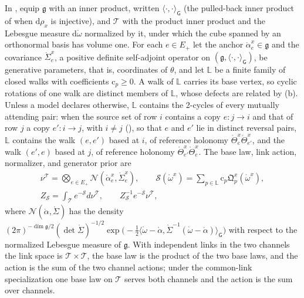 In , equip $\mathfrak g$ with an inner product,
written $\langle\cdot,\cdot\rangle_{\mathsf G}$ (the pulled-back inner product of
 when $\mathrm d\rho_x$ is injective), and $\mathscr T$ with the product inner
product and the Lebesgue measure $\mathrm d\mathring\omega$ normalized by it, under which the cube
spanned by an orthonormal basis has volume one. For each $e\in E_+$ let the anchor
$\mathring\alpha^x_e\in\mathfrak g$ and the covariance $\mathring\Sigma^x_e$, a positive definite
self-adjoint operator on $(\mathfrak g,\langle\cdot,\cdot\rangle_{\mathsf G})$, be generative parameters,
that is, coordinates of $\theta$, and let $\mathbb L$ be a finite family of closed walks with coefficients
$\mathrm c_p\geq0$. A walk of $\mathbb L$ carries its base vertex, so cyclic rotations of one walk are
distinct members of $\mathbb L$, whose defects are related by (b).
Unless a model declares otherwise, $\mathbb L$ contains the 2-cycles of every mutually attending pair:
when the source set of row $i$ contains a copy $e:j\to i$ and that of row $j$ a copy $e':i\to j$, with
$i\neq j$ (), so that $e$ and $e'$ lie in distinct reversal pairs,
$\mathbb L$ contains the walk $(e,e')$ based at $i$, of reference holonomy
$\mathring\Theta^x_e\mathring\Theta^x_{e'}$, and the walk $(e',e)$ based at $j$, of reference holonomy
$\mathring\Theta^x_{e'}\mathring\Theta^x_e$. The base law, link action, normalizer, and generator prior are
\begin{gather}
\nu^{\mathscr T}=\bigotimes_{e\in E_+}\mathcal N(\mathring\alpha^x_e,\mathring\Sigma^x_e),
\qquad
\mathscr S(\mathring\omega^x)=\sum_{p\in\mathbb L}\mathrm c_p\mathfrak Q^x_p(\mathring\omega^x),
\label{eq:link-base-action}\\
Z_{\mathscr S}=\int_{\mathscr T}e^{-\mathscr S}d\nu^{\mathscr T},
\qquad
Z_{\mathscr S}^{-1}e^{-\mathscr S}\nu^{\mathscr T},
\label{eq:link-generator-prior}
\end{gather}
where $\mathcal N(\mathring\alpha,\mathring\Sigma)$ has the density
$(2\pi)^{-\dim\mathfrak g/2}(\det\mathring\Sigma)^{-1/2}\exp\bigl(-\tfrac12\langle\mathring\omega-\mathring\alpha,\mathring\Sigma^{-1}(\mathring\omega-\mathring\alpha)\rangle_{\mathsf G}\bigr)$
with respect to the normalized Lebesgue measure of $\mathfrak g$. With independent links in the two
channels the link space is $\mathscr T\times\mathscr T$, the base law is the product of the two base
laws, and the action is the sum of the two channel actions; under the common-link specialization one
base law on $\mathscr T$ serves both channels and the action is the sum over channels.

